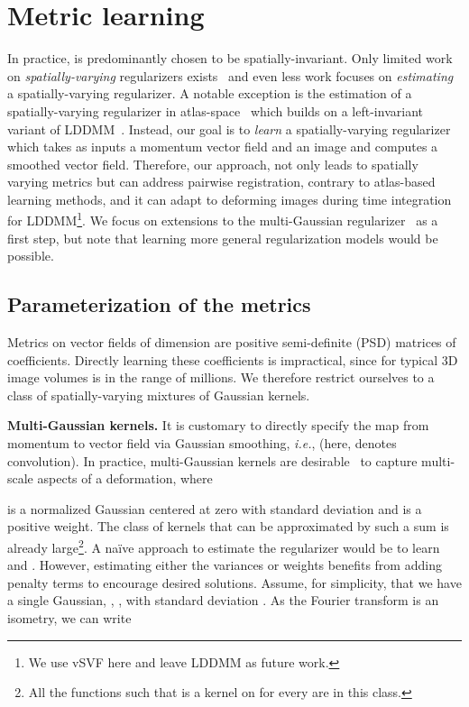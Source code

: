 \documentclass[10pt,twocolumn,letterpaper,table]{article}
\numberwithin{equation}{section}
\theoremstyle{plain}
\theoremstyle{definition}
\def\ie{\emph{i.e.}}  \def\Ie{\emph{I.e.}}
\begin{document}
\section{Metric learning}
\label{sec:metric_learning}

In practice,  is predominantly chosen to be spatially-invariant. Only limited work on \emph{spatially-varying} regularizers exists~\cite{risser2013piecewise,pace2013locally,stefanescu2004grid} and even less work focuses on \emph{estimating} a spatially-varying regularizer. A notable exception is the estimation of a spatially-varying regularizer in atlas-space~\cite{vialard2014spatially} which builds on a left-invariant variant of LDDMM~\cite{schmah2013left}. Instead, our goal is to \emph{learn} a spatially-varying regularizer which takes as inputs a momentum vector field and an image and computes a smoothed vector field. Therefore, our approach, not only leads to spatially varying metrics but can address pairwise registration, contrary to atlas-based learning methods, and it can adapt to deforming images during time integration for LDDMM\footnote{We use vSVF here and leave LDDMM as future work.}. We focus on extensions to the multi-Gaussian regularizer~\cite{risser2011simultaneous} as a first step, but note that learning more general regularization models would be possible.

\subsection{Parameterization of the metrics}
Metrics on vector fields of dimension  are positive semi-definite (PSD) matrices of  coefficients. Directly learning these  coefficients is impractical, since for typical 3D image volumes  is in the range of millions. We therefore restrict ourselves to a class of spatially-varying mixtures of Gaussian kernels.

\noindent
\textbf{Multi-Gaussian kernels.}
It is customary to directly specify 
the map from momentum to vector field via Gaussian smoothing, \ie,  (here,  denotes convolution). In practice, multi-Gaussian kernels are desirable~\cite{risser2011simultaneous} to capture multi-scale aspects of a deformation, where

 is a normalized Gaussian centered at zero with standard deviation  and  is a positive weight. The class of kernels that can be approximated by such a sum is already large\footnote{All the functions  such that  is a kernel on  for every  are in this class.}. 
A na\"ive approach to estimate the regularizer would be to learn  and . However, estimating either the variances or weights benefits from adding penalty terms to encourage desired solutions. Assume, for simplicity, that we have a single Gaussian, , , with standard deviation . As the Fourier transform is an  isometry, we can write
\end{document}
